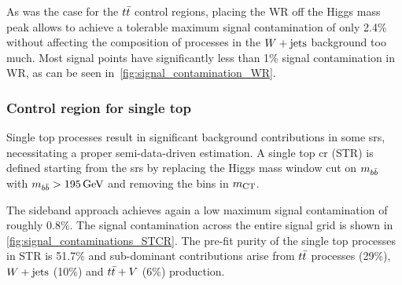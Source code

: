 As was the case for the $t\bar{t}$ control regions, placing the WR off the Higgs mass peak allows to achieve a tolerable maximum signal contamination of only 2.4\% without affecting the composition of processes in the $W+\mathrm{jets}$ background too much.
Most signal points have significantly less than 1\% signal contamination in WR, as can be seen in~\cref{fig:signal_contamination_WR}. 


\subsubsection{Control region for single top}

Single top processes result in significant background contributions in some \glspl{sr}, necessitating a proper semi-data-driven estimation.
A single top \gls{cr} (STR) is defined starting from the \glspl{sr} by replacing the Higgs mass window cut on $m_{b\bar{b}}$ with $\mbb > \SI{195}{\GeV}$ and removing the bins in $m_{\textrm{CT}}$. 

The sideband approach achieves again a low maximum signal contamination of roughly 0.8\%.
The signal contamination across the entire signal grid is shown in \cref{fig:signal_contaminations_STCR}.
The pre-fit purity of the single top processes in STR is 51.7\% and sub-dominant contributions arise from $t\bar{t}$ processes (29\%), $W+\mathrm{jets}$ (10\%) and $t\bar{t}+V$ (6\%) production. 

